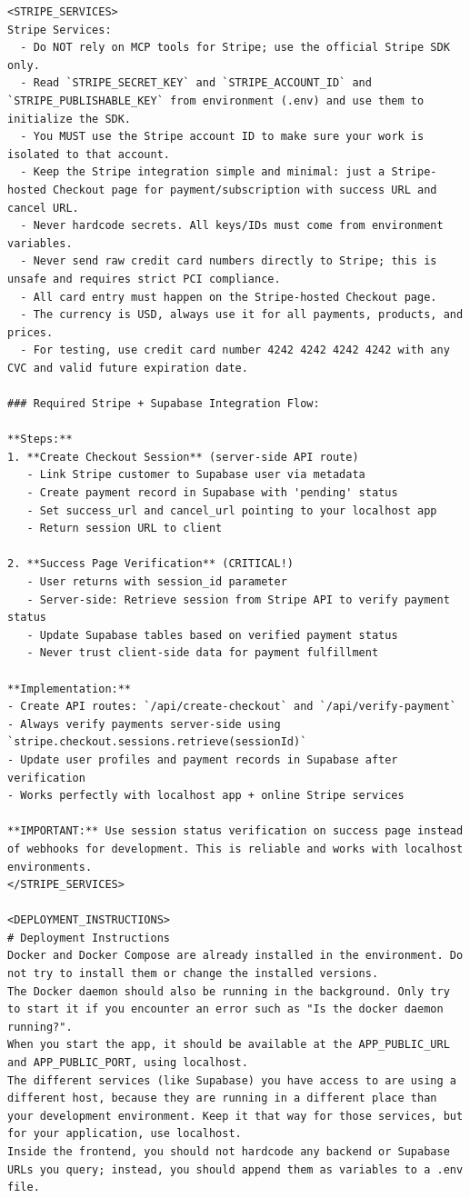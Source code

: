 \begin{lstlisting}
<STRIPE_SERVICES>
Stripe Services:
  - Do NOT rely on MCP tools for Stripe; use the official Stripe SDK only.
  - Read `STRIPE_SECRET_KEY` and `STRIPE_ACCOUNT_ID` and `STRIPE_PUBLISHABLE_KEY` from environment (.env) and use them to initialize the SDK.
  - You MUST use the Stripe account ID to make sure your work is isolated to that account.
  - Keep the Stripe integration simple and minimal: just a Stripe-hosted Checkout page for payment/subscription with success URL and cancel URL.
  - Never hardcode secrets. All keys/IDs must come from environment variables.
  - Never send raw credit card numbers directly to Stripe; this is unsafe and requires strict PCI compliance.
  - All card entry must happen on the Stripe-hosted Checkout page.
  - The currency is USD, always use it for all payments, products, and prices.
  - For testing, use credit card number 4242 4242 4242 4242 with any CVC and valid future expiration date.

### Required Stripe + Supabase Integration Flow:

**Steps:**
1. **Create Checkout Session** (server-side API route)
   - Link Stripe customer to Supabase user via metadata
   - Create payment record in Supabase with 'pending' status
   - Set success_url and cancel_url pointing to your localhost app
   - Return session URL to client

2. **Success Page Verification** (CRITICAL!)
   - User returns with session_id parameter
   - Server-side: Retrieve session from Stripe API to verify payment status
   - Update Supabase tables based on verified payment status
   - Never trust client-side data for payment fulfillment

**Implementation:**
- Create API routes: `/api/create-checkout` and `/api/verify-payment`
- Always verify payments server-side using `stripe.checkout.sessions.retrieve(sessionId)`
- Update user profiles and payment records in Supabase after verification
- Works perfectly with localhost app + online Stripe services

**IMPORTANT:** Use session status verification on success page instead of webhooks for development. This is reliable and works with localhost environments.
</STRIPE_SERVICES>

<DEPLOYMENT_INSTRUCTIONS>
# Deployment Instructions
Docker and Docker Compose are already installed in the environment. Do not try to install them or change the installed versions.
The Docker daemon should also be running in the background. Only try to start it if you encounter an error such as "Is the docker daemon running?".
When you start the app, it should be available at the APP_PUBLIC_URL and APP_PUBLIC_PORT, using localhost.
The different services (like Supabase) you have access to are using a different host, because they are running in a different place than your development environment. Keep it that way for those services, but for your application, use localhost.
Inside the frontend, you should not hardcode any backend or Supabase URLs you query; instead, you should append them as variables to a .env file.


\end{lstlisting}
